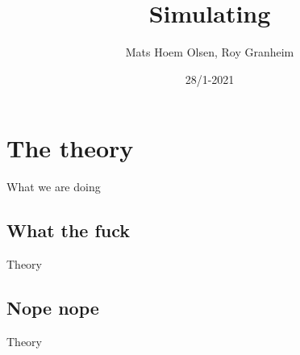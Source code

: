 \documentclass[12pt]{beamer}
\begin{document}
\author{Mats Hoem Olsen, Roy Granheim}
\title{Simulating}
\date{28/1-2021}
\subject{INF200}

\begin{frame}
\maketitle
\end{frame}

\begin{frame}
\tableofcontents
\end{frame}
\section{The theory}
\begin{frame}{What we are doing}

\end{frame}
\subsection{What the fuck}
\begin{frame}{Theory}

\end{frame}

\subsection{Nope nope}
\begin{frame}{Theory}

\end{frame}
\end{document}
